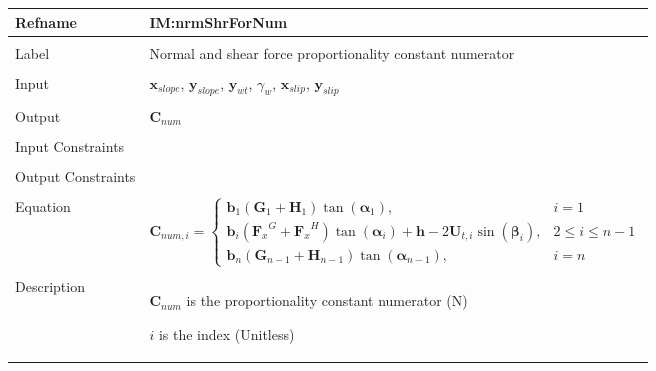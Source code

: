 \documentclass[12pt]{article}
\begin{document}
\noindent \begin{minipage}{\textwidth}
          \begin{tabular}{>{\raggedright}p{}>{\raggedright\arraybackslash}p{}}
          \toprule \textbf{Refname} & \textbf{IM:nrmShrForNum}
          \label{IM:nrmShrForNum}
          \\ \midrule \\
          Label & Normal and shear force proportionality constant numerator
          \\ \midrule \\
          Input & ${\mathbf{x}_{slope}}$, ${\mathbf{y}_{slope}}$, ${\mathbf{y}_{wt}}$, ${γ_{w}}$, ${\mathbf{x}_{slip}}$, ${\mathbf{y}_{slip}}$
          \\ \midrule \\
          Output & ${\mathbf{C}_{num}}$
          \\ \midrule \\
          Input Constraints & 
          \\ \midrule \\
          Output Constraints & 
          \\ \midrule \\
          Equation & \begin{displaymath}
                     {\mathbf{C}_{num,i}}=\begin{cases}
                                          {\mathbf{b}}_{1} \left({\mathbf{G}}_{1}+{\mathbf{H}}_{1}\right) \tan\left({\mathbf{α}}_{1}\right), & i=1\\
{\mathbf{b}}_{i} \left({{\mathbf{F}_{x}}^{G}}+{{\mathbf{F}_{x}}^{H}}\right) \tan\left({\mathbf{α}}_{i}\right)+\mathbf{h} -2 {\mathbf{U}_{t,i}} \sin\left({\mathbf{β}}_{i}\right), & 2\leq{}i\leq{}n-1\\
{\mathbf{b}}_{n} \left({\mathbf{G}}_{n-1}+{\mathbf{H}}_{n-1}\right) \tan\left({\mathbf{α}}_{n-1}\right), & i=n
                                          \end{cases}
                     \end{displaymath}
          \\ \midrule \\
          Description & \begin{symbDescription}
                        \item{${\mathbf{C}_{num}}$ is the proportionality constant numerator (N)}
                        \item{$i$ is the index (Unitless)}

\end{symbDescription}
\end{tabular}
\end{minipage}
\end{document}
